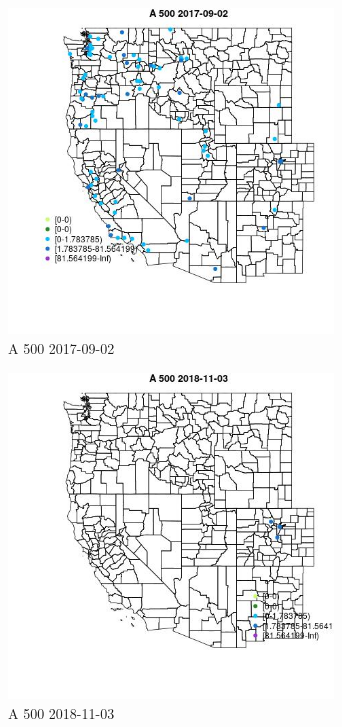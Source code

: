 \begin{figure} 
\centering  
\includegraphics[width=0.77\textwidth]{Code_Outputs/Report_ML_input_PM25_Step4_part_e_de_duplicated_aveswNAs_MapObsA_5002017-09-02.jpg} 
\caption{\label{fig:Report_ML_input_PM25_Step4_part_e_de_duplicated_aveswNAsMapObsA_5002017-09-02}A 500 2017-09-02} 
\end{figure} 
 

\begin{figure} 
\centering  
\includegraphics[width=0.77\textwidth]{Code_Outputs/Report_ML_input_PM25_Step4_part_e_de_duplicated_aveswNAs_MapObsA_5002018-11-03.jpg} 
\caption{\label{fig:Report_ML_input_PM25_Step4_part_e_de_duplicated_aveswNAsMapObsA_5002018-11-03}A 500 2018-11-03} 
\end{figure} 
 

